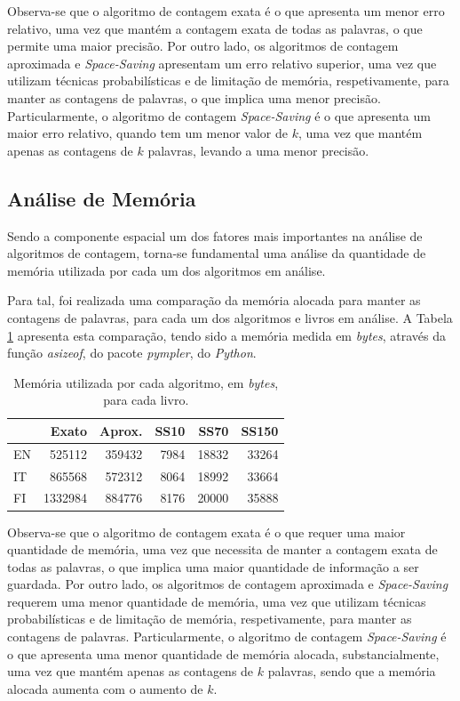 \documentclass[mirror, portugues]{revdetua}
\begin{document}
Observa-se que o algoritmo de contagem exata é o que apresenta um menor erro relativo, uma vez que mantém a contagem exata de todas as palavras, o que permite uma maior precisão. Por outro lado, os algoritmos de contagem aproximada e \textit{Space-Saving} apresentam um erro relativo superior, uma vez que utilizam técnicas probabilísticas e de limitação de memória, respetivamente, para manter as contagens de palavras, o que implica uma menor precisão. Particularmente, o algoritmo de contagem \textit{Space-Saving} é o que apresenta um maior erro relativo, quando tem um menor valor de $k$, uma vez que mantém apenas as contagens de $k$ palavras, levando a uma menor precisão.

\subsection{Análise de Memória}

Sendo a componente espacial um dos fatores mais importantes na análise de algoritmos de contagem, torna-se fundamental uma análise da quantidade de memória utilizada por cada um dos algoritmos em análise.

Para tal, foi realizada uma comparação da memória alocada para manter as contagens de palavras, para cada um dos algoritmos e livros em análise. A Tabela \ref{table:memoria} apresenta esta comparação, tendo sido a memória medida em \textit{bytes}, através da função \textit{asizeof}, do pacote \textit{pympler}, do \textit{Python}.

\begin{table}[H]
\centering
\caption{Memória utilizada por cada algoritmo, em \textit{bytes}, para cada livro.}
\label{table:memoria}
\begin{tabular}{lrrrrr}
\toprule
& Exato & Aprox. & SS10 & SS70 & SS150 \\
\midrule
EN & 525112 & 359432 & 7984 & 18832 & 33264 \\
IT & 865568 & 572312 & 8064 & 18992 & 33664 \\
FI &1332984 & 884776 & 8176 & 20000 & 35888 \\
\bottomrule
\end{tabular}
\end{table}

Observa-se que o algoritmo de contagem exata é o que requer uma maior quantidade de memória, uma vez que necessita de manter a contagem exata de todas as palavras, o que implica uma maior quantidade de informação a ser guardada. Por outro lado, os algoritmos de contagem aproximada e \textit{Space-Saving} requerem uma menor quantidade de memória, uma vez que utilizam técnicas probabilísticas e de limitação de memória, respetivamente, para manter as contagens de palavras. Particularmente, o algoritmo de contagem \textit{Space-Saving} é o que apresenta uma menor quantidade de memória alocada, substancialmente, uma vez que mantém apenas as contagens de $k$ palavras, sendo que a memória alocada aumenta com o aumento de $k$.
\end{document}
